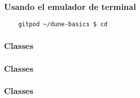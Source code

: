 \begin{frame}
  \frametitle{Usando el emulador de terminal}



\end{frame}

\begin{frame}

\end{frame}

\begin{frame}[fragile]
  \begin{lstlisting}
    gitpod ~/dune-basics $ cd
  \end{lstlisting}
\end{frame}


\begin{frame}[fragile]
  \frametitle{Classes}

  


\end{frame}

\begin{frame}[fragile]
  \frametitle{Classes}

  

\end{frame}

\begin{frame}[fragile]
  \frametitle{Classes}

  

\end{frame}

